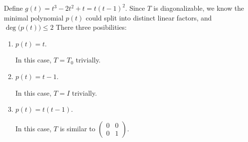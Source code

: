 \begin{Exercise}
\begin{solution}
Define $g(t) = t^3-2t^2+t = t(t-1)^2$.
Since $T$ is diagonalizable, we know the minimal polynomial $p(t)$ could split into distinct linear factors, and $\deg\big(p(t)\big) \leq 2$ 
There three posibilities:
\begin{enumerate}
\item $p(t) = t$.

In this case, $T = T_0$ trivially.

\item $p(t) = t-1$.

In this case, $T = I$ trivially.

\item $p(t) = t(t-1)$.

In this case, $T$ is similar to $\begin{pmatrix}
0 & 0 \\
0 & 1
\end{pmatrix}$.
\end{enumerate}
\end{solution}
\end{Exercise}